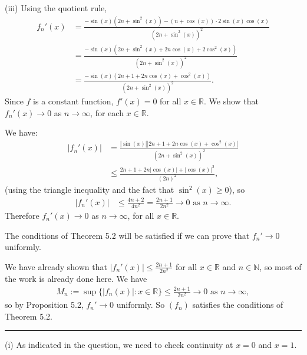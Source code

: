 \documentclass[letterpaper,10pt,english]{jupyterBook}
\begin{document}
\sphinxAtStartPar
(iii) Using the quotient rule,
\begin{align*}
f_n'(x) &= \frac{-\sin(x)(2n+\sin^2(x))-(n+\cos(x))\cdot 2\sin(x)\cos(x)}{\left(2n+\sin^2(x)\right)^2} \\
&= \frac{-\sin(x)\left(2n+\sin^2(x)+2n\cos(x)+2\cos^2(x)\right)}{\left(2n+\sin^2(x)\right)^2} \\
&= \frac{-\sin(x)\left(2n+1+2n\cos(x)+\cos^2(x)\right)}{\left(2n+\sin^2(x)\right)^2}.
\end{align*}
\sphinxAtStartPar
Since \(f\) is a constant function, \(f'(x)=0\) for all \(x\in\mathbb{R}\). We show that \(f_n'(x)\rightarrow 0\) as \(n\rightarrow\infty\), for each \(x\in\mathbb{R}\).

We have:
\begin{align*}
|f_n'(x)| &= \frac{|\sin(x)|\left|2n+1+2n\cos(x)+\cos^2(x)\right|}{\left(2n+\sin^2(x)\right)^2} \\
&\leq \frac{2n+1+2n|\cos(x)|+|\cos(x)|^2}{\left(2n\right)^2},
\end{align*}
\sphinxAtStartPar
(using the triangle inequality and the fact that \(\sin^2(x)\geq 0\)), so
\begin{align*}
|f_n'(x)| &\leq \frac{4n+2}{4n^2} = \frac{2n+1}{2n^2} \rightarrow 0 \text{ as } n\rightarrow \infty.
\end{align*}
\sphinxAtStartPar
Therefore \(f_n'(x)\rightarrow 0\) as \(n\rightarrow \infty\), for all \(x\in\mathbb{R}\).

The conditions of Theorem 5.2 will be satisfied if we can prove that \(f_n'\rightarrow 0\) uniformly.

We have already shown that \(|f_n'(x)|\leq \frac{2n+1}{2n^2}\) for all \(x\in\mathbb{R}\) and \(n\in\mathbb{N}\), so most of the work is already done here. We have
\begin{equation*}
\begin{split}
M_n := \sup\{|f_n(x)|:x\in\mathbb{R}\} \leq \frac{2n+1}{2n^2}\rightarrow 0 \text{ as } n\rightarrow\infty,
\end{split}
\end{equation*}
\sphinxAtStartPar
so by Proposition 5.2, \(f_n'\rightarrow 0\) uniformly. So \((f_n)\) satisfies the conditions of Theorem 5.2.


\bigskip\hrule\bigskip


\sphinxAtStartPar
{\hyperref[\detokenize{Problems:id59}]{}}
(i) As indicated in the question, we need to check continuity at \(x=0\) and \(x=1\).
\end{document}
